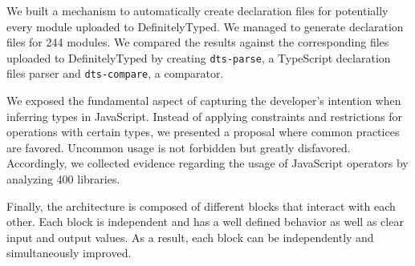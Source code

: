 \documentclass[english,cleveref,autoref,submission]{programming}
\begin{document}
We built a mechanism to automatically create declaration files for potentially every module uploaded to DefinitelyTyped. We managed to generate declaration files for 244 modules. We compared the results against the corresponding files uploaded to DefinitelyTyped by creating \texttt{dts-parse}, a TypeScript declaration files parser and \texttt{dts-compare}, a comparator.

We exposed the fundamental aspect of capturing the developer's intention when inferring types in JavaScript. Instead of applying constraints and restrictions for operations with certain types, we presented a proposal where common practices are favored. Uncommon usage is not forbidden but greatly disfavored. Accordingly, we collected evidence regarding the usage of JavaScript operators by analyzing 400 libraries.

Finally, the architecture is composed of different blocks that interact with each other. Each block is independent and has a well defined behavior as well as clear input and output values. As a result, each block can be independently and simultaneously improved.

\printbibliography
\end{document}
